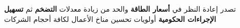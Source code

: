 تصدر إعادة النظر في \textbf{أسعار الطاقة} والحد من زيادة معدلات \textbf{التضخم} ثم \textbf{تسهيل الإجراءات الحكومية} أولويات تحسين مناخ الأعمال لكافة أحجام الشركات
